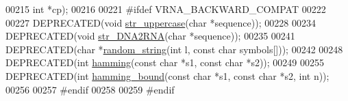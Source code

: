 \begin{DoxyCode}
00215                             \textcolor{keywordtype}{int} *cp);
00216 
00221 \textcolor{preprocessor}{#ifdef  VRNA\_BACKWARD\_COMPAT}
00222 
00227 DEPRECATED(\textcolor{keywordtype}{void}  \hyperlink{string__utils_8h_a17b796b806f96b70382077fb5bc519bb}{str\_uppercase}(\textcolor{keywordtype}{char} *sequence));
00228 
00234 DEPRECATED(\textcolor{keywordtype}{void} \hyperlink{string__utils_8h_ad3f18dd83f958f18b2f26ecb99305208}{str\_DNA2RNA}(\textcolor{keywordtype}{char} *sequence));
00235 
00241 DEPRECATED(\textcolor{keywordtype}{char} *\hyperlink{string__utils_8h_a1b95eac365a021572e1c37e5993a89be}{random\_string}(\textcolor{keywordtype}{int} l, \textcolor{keyword}{const} \textcolor{keywordtype}{char} symbols[]));
00242 
00248 DEPRECATED(\textcolor{keywordtype}{int} \hyperlink{string__utils_8h_ad9dc7bfc9aa664dc6698f17ce07fc7e7}{hamming}(\textcolor{keyword}{const} \textcolor{keywordtype}{char} *s1, \textcolor{keyword}{const} \textcolor{keywordtype}{char} *s2));
00249 
00255 DEPRECATED(\textcolor{keywordtype}{int} \hyperlink{string__utils_8h_a96d3c36717d624514055ce201cab1542}{hamming\_bound}(\textcolor{keyword}{const} \textcolor{keywordtype}{char} *s1, \textcolor{keyword}{const} \textcolor{keywordtype}{char} *s2, \textcolor{keywordtype}{int} n));
00256 
00257 \textcolor{preprocessor}{#endif}
00258 
00259 \textcolor{preprocessor}{#endif}
\end{DoxyCode}
